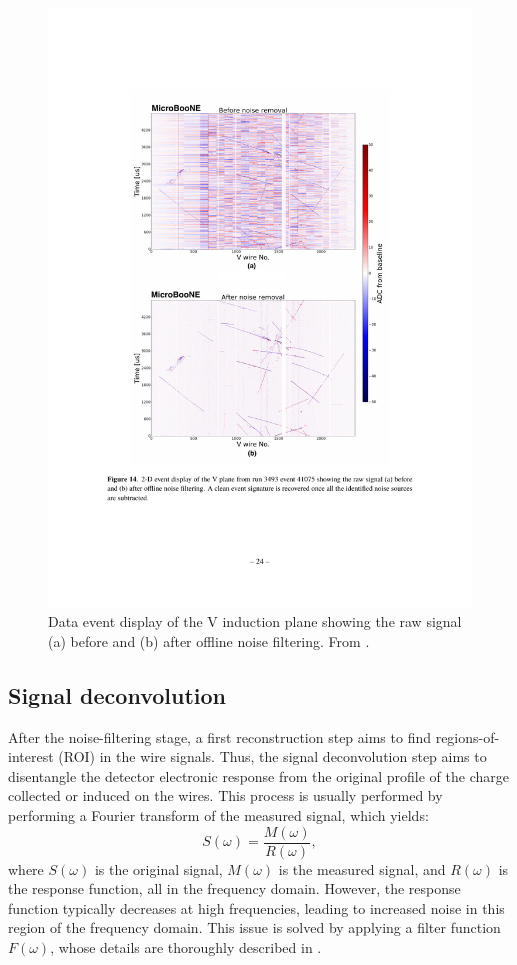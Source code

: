 \begin{figure}[htbp]
    \centering
    \includegraphics[width=0.75\linewidth]{figures/evd_noise.pdf}
    \caption{Data event display of the V induction plane showing the raw signal (a) before and (b) after offline noise filtering. From \cite{Acciarri:2017sde}.}
    \label{fig:evd_noise}
\end{figure}

\subsection{Signal deconvolution}
After the noise-filtering stage, a first reconstruction step aims to find regions-of-interest (ROI) in the wire signals. Thus, the signal deconvolution step aims to disentangle the detector electronic response from the original profile of the charge collected or induced on the wires. This process is usually performed by performing a Fourier transform of the measured signal, which yields:
\begin{equation}
    S(\omega) = \frac{M(\omega)}{R(\omega)},
\end{equation}
where $S(\omega)$ is the original signal, $M(\omega)$ is the measured signal, and $R(\omega)$ is the response function, all in the frequency domain. However, the response function typically decreases at high frequencies, leading to increased noise in this region of the frequency domain. This issue is solved by applying a filter function $F(\omega)$, whose details are thoroughly described in \cite{Adams:2018dra}. 


